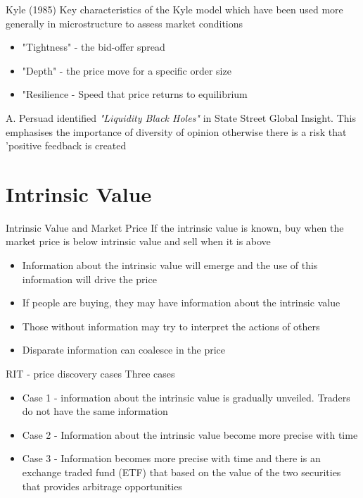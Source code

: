 \documentclass[14pt,xcolor=pdftex,dvipsnames,table]{beamer}
\begin{document}
\begin{frame}{Kyle (1985)}
Key characteristics of the Kyle model which have been used more generally in microstructure to assess market conditions
\pause
\begin{itemize}[<+-| alert@+>]
\item "Tightness" - the bid-offer spread
\item "Depth" - the price move for a specific order size
\item "Resilience - Speed that price returns to equilibrium
\end{itemize}
\pause
A. Persuad identified \emph{"Liquidity Black Holes"} in State Street Global Insight.  This emphasises the importance of diversity of opinion otherwise there is a risk that 'positive feedback is created
\end{frame}

\section{Intrinsic Value}
\begin{frame}{Intrinsic Value and Market Price}
If the intrinsic value is known, buy when the market price is below intrinsic value and sell when it is above
\pause
\begin{itemize}[<+-| alert@+>]
\item Information about the intrinsic value will emerge and the use of this information will drive the price 
\item If people are buying, they may have information about the intrinsic value
\item Those without information may try to interpret the actions of others
\item Disparate information can coalesce in the price
\end{itemize}
\end{frame}

\begin{frame}{RIT - price discovery cases}
Three cases
\pause
\begin{itemize}[<+-| alert@+>]
\item Case 1 - information about the intrinsic value is gradually unveiled.  Traders do not have the same information 
\item Case 2 - Information about the intrinsic value become more precise with time
\item Case 3 - Information becomes more precise with time and there is an exchange traded fund (ETF) that based on the value of the two securities that provides arbitrage opportunities  
\end{itemize}
\end{frame}
\end{document}
